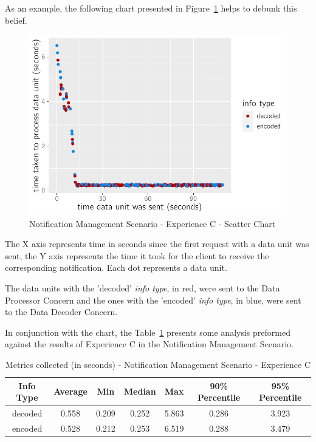 As an example, the following chart presented in Figure~\ref{fig:evaluation:overview:decoproc:chart:s3eC} helps to debunk this belief.

\begin{figure}[H]
    \centering
    \includegraphics[page=1]{assets/charts/s3eC.pdf}
    \caption[Notification Management Scenario - Experience C - Scatter Chart]{Notification Management Scenario - Experience C - Scatter Chart}
    \label{fig:evaluation:overview:decoproc:chart:s3eC}
\end{figure}

The X axis represents time in seconds since the first request with a data unit was sent, the Y axis represents the time it took for the client to receive the corresponding notification. Each dot represents a data unit.

The data units with the 'decoded' \textit{info type}, in red, were sent to the Data Processor Concern and the ones with the 'encoded' \textit{info type}, in blue, were sent to the Data Decoder Concern.

In conjunction with the chart, the Table~\ref{tab:evaluation:overview:decoproc:results} presents some analysis preformed against the results of Experience C in the Notification Management Scenario.

\begin{table}[H]
    \caption{Metrics collected (in seconds) - Notification Management Scenario - Experience C}
    \label{tab:evaluation:overview:decoproc:results}
    \centering
    \begin{tabular}{@{}ccccccc@{}}
    \toprule
    \textbf{Info Type} & \textbf{Average} & \textbf{Min} & \textbf{Median} & \textbf{Max} & \textbf{90\% Percentile} & \textbf{95\% Percentile} \\ \midrule
    decoded & 0.558 & 0.209 & 0.252 & 5.863 & 0.286 & 3.923 \\ \midrule
    encoded & 0.528 & 0.212 & 0.253 & 6.519 & 0.288 & 3.479 \\ \bottomrule
    \end{tabular}
\end{table}


